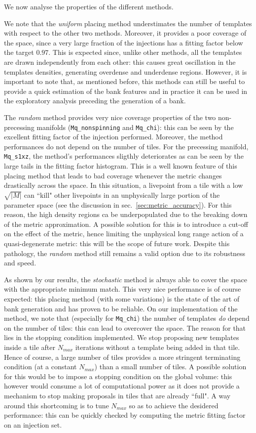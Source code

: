 \documentclass[twocolumn,showpacs,preprintnumbers,nofootinbib,prd,
superscriptaddress,10pt]{revtex4-2}
\begin{document}
We now analyse the properties of the different methods.

We note that the {\it uniform} placing method understimates the number of templates with respect to the other two methods. Moreover, it provides a poor coverage of the space, since a very large fraction of the injections has a fitting factor below the target $0.97$. This is expected since, unlike other methods, all the templates are drawn independently from each other: this causes great oscillation in the templates densities, generating overdense and underdense regions.
However, it is important to note that, as mentioned before, this methods can still be useful to provide a quick estimation of the bank features and in practice it can be used in the exploratory analysis preceding the generation of a bank.

The {\it random} method provides very nice coverage properties of the two non-precessing manifolds (\texttt{Mq\_nonspinning} and \texttt{Mq\_chi}): this can be seen by the excellent fitting factor of the injection performed. Moreover, the method performances do not depend on the number of tiles.
For the precessing manifold, \texttt{Mq\_s1xz}, the method's performances sligthly deteriorates as can be seen by the large tails in the fitting factor histogram.
This is a well known feature of this placing method that leads to bad coverage whenever the metric changes drastically across the space. In this situation, a livepoint from a tile with a low $\sqrt{|M|}$ can ``kill" other livepoints in an unphysically large portion of the parameter space (see the discussion in sec.~\ref{sec:metric_accuracy}). For this reason, the high density regions ca be underpopulated due to the breaking down of the metric approximation. A possible solution for this is to introduce a cut-off on the effect of the metric, hence limiting the unphysical long range action of a quasi-degenerate metric: this will be the scope of future work.
Despite this pathology, the {\it random} method still remains a valid option due to its robustness and speed.

As shown by our results, the {\it stochastic} method is always able to cover the space with the appropriate minimum match. This very nice performance is of course expected: this placing method (with some variations) is the state of the art of bank generation and has proven to be reliable.
On our implementation of the method, we note that (especially for \texttt{Mq\_chi}) the number of templates {\it do} depend on the number of tiles: this can lead to overcover the space. The reason for that lies in the stopping condition implemented. We stop proposing new templates inside a tile after $N_{max}$ iterations without a template being added in that tile. Hence of course, a large number of tiles provides a more stringent terminating condition (at a constant $N_{max}$) than a small number of tiles.
A possible solution for this would be to impose a stopping condition on the global volume: this however would consume a lot of computational power as it does not provide a mechanism to stop making proposals in tiles that are already ``full".
A way around this shortcoming is to tune $N_{max}$ so as to achieve the desidered performance: this can be quickly checked by computing the metric fitting factor on an injection set.
\end{document}
